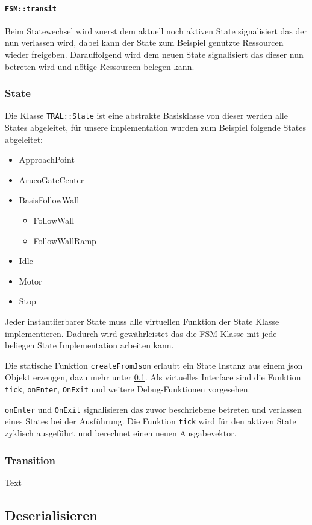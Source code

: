 \paragraph{\texttt{FSM::transit}}

Beim Statewechsel wird zuerst dem aktuell noch aktiven State signalisiert das der nun verlassen wird, dabei kann der State
zum Beispiel genutzte Ressourcen wieder freigeben. Darauffolgend wird dem neuen State signalisiert das dieser nun betreten wird und nötige Ressourcen belegen kann.


\subsubsection{State}
Die Klasse \texttt{TRAL::State} ist eine abstrakte Basisklasse von dieser werden alle States abgeleitet, für unsere implementation wurden zum Beispiel folgende States abgeleitet:

\begin{itemize}
	\item ApproachPoint
	\item ArucoGateCenter
	\item BasisFollowWall
	\begin{itemize}
		\item FollowWall
		\item FollowWallRamp
	\end{itemize}
	\item Idle
	\item Motor
	\item Stop
\end{itemize}

Jeder instantiierbarer State muss alle virtuellen Funktion der State Klasse implementieren. Dadurch wird gewährleistet das die FSM Klasse mit jede beliegen State Implementation arbeiten kann.

Die statische Funktion \texttt{createFromJson} erlaubt ein State Instanz aus einem json Objekt erzeugen, dazu mehr unter \ref{fsm-Deserialisieren}. Als virtuelles Interface sind die Funktion \texttt{tick}, \texttt{onEnter}, \texttt{OnExit} und weitere Debug-Funktionen vorgesehen.

\texttt{onEnter} und \texttt{OnExit} signalisieren das zuvor beschriebene betreten und verlassen eines States bei der Ausführung. Die Funktion \texttt{tick} wird für den aktiven State zyklisch ausgeführt und berechnet einen neuen Ausgabevektor.


\subsubsection{Transition}
Text

\subsection{Deserialisieren}
\label{fsm-Deserialisieren}
